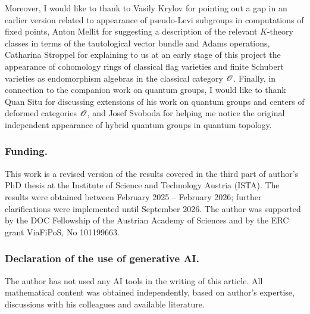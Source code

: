 Moreover, I would like to thank to Vasily Krylov for pointing out a gap in an earlier version related to appearance of pseudo-Levi subgroups in computations of fixed points, Anton Mellit for suggesting a description of the relevant $K$-theory classes in terms of the tautological vector bundle and Adams operations, Catharina Stroppel for explaining to us at an early stage of this project the appearance of cohomology rings of classical flag varieties and finite Schubert varieties as endomorphism algebras in the classical category $\operatorname{\mathscr{O}}$.
%
Finally, in connection to the companion work on quantum groups, I would like to thank Quan Situ for discussing extensions of his work on quantum groups and centers of deformed categories $\operatorname{\mathscr{O}}$, and Josef Svoboda for helping me notice the original independent appearance of hybrid quantum groups in quantum topology.

\subsubsection{Funding.}
This work is a revised version of the results covered in the third part of author's PhD thesis \cite[Chapter III]{LowPhD} at the Institute of Science and Technology Austria (ISTA). The results were obtained between February 2025 -- February 2026; further clarifications were implemented until September 2026. The author was supported by the DOC Fellowship of the Austrian Academy of Sciences and by the ERC grant ViaFiPoS, No 101199663.

\subsubsection{Declaration of the use of generative AI.}
The author has not used any AI tools in the writing of this article. All mathematical content was obtained independently, based on author's expertise, discussions with his colleagues and available literature.